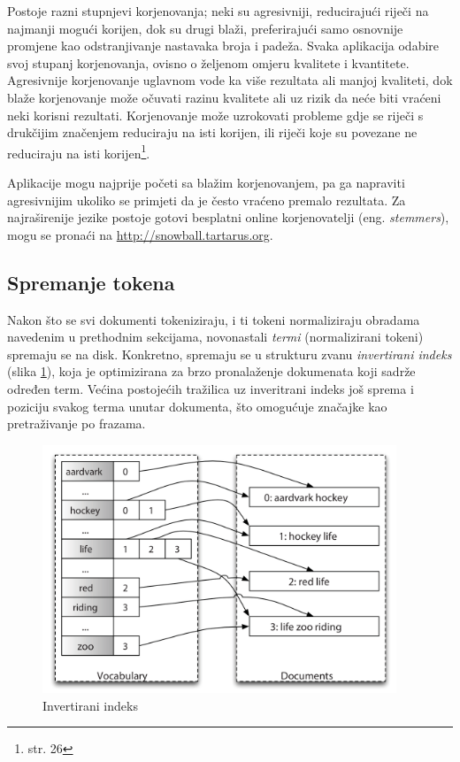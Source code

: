 \documentclass[a4paper,twoside,12pt]{scrreprt}
\begin{document}
Postoje razni stupnjevi korjenovanja; neki su agresivniji, reducirajući riječi na najmanji mogući korijen, dok su drugi blaži, preferirajući samo osnovnije promjene kao odstranjivanje nastavaka broja i padeža. Svaka aplikacija odabire svoj stupanj korjenovanja, ovisno o željenom omjeru kvalitete i kvantitete. Agresivnije korjenovanje uglavnom vode ka više rezultata ali manjoj kvaliteti, dok blaže korjenovanje može očuvati razinu kvalitete ali uz rizik da neće biti vraćeni neki korisni rezultati. Korjenovanje može uzrokovati probleme gdje se riječi s drukčijim značenjem reduciraju na isti korijen, ili riječi koje su povezane ne reduciraju na isti korijen\footnote{\cite{taming} str. 26}.

Aplikacije mogu najprije početi sa blažim korjenovanjem, pa ga napraviti agresivnijim ukoliko se primjeti da je često vraćeno premalo rezultata. Za najraširenije jezike postoje gotovi besplatni online korjenovatelji (eng. \textit{stemmers}), mogu se pronaći na \url{http://snowball.tartarus.org}.

\subsection{Spremanje tokena}

Nakon što se svi dokumenti tokeniziraju, i ti tokeni normaliziraju obradama navedenim u prethodnim sekcijama, novonastali \textit{termi} (normalizirani tokeni) spremaju se na disk. Konkretno, spremaju se u strukturu zvanu \textit{invertirani indeks} (slika \ref{inverted_index}), koja je optimizirana za brzo pronalaženje dokumenata koji sadrže određen term. Većina postojećih tražilica uz inveritrani indeks još sprema i poziciju svakog terma unutar dokumenta, što omogućuje značajke kao pretraživanje po frazama.

\begin{figure}[H]
  \centering
  \includegraphics[width=300pt]{inverted_index}
  \caption{Invertirani indeks}
  \label{inverted_index}
\end{figure}
\end{document}
